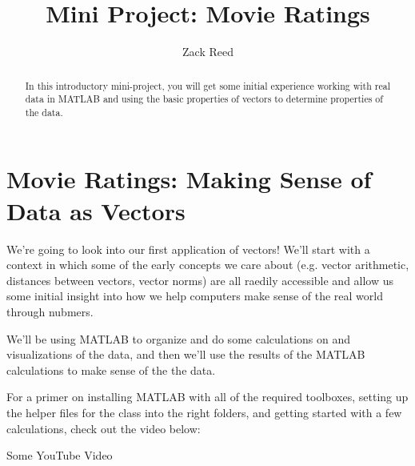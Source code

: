 \documentclass{ximera}
\author{Zack Reed}
\title{Mini Project: Movie Ratings}
\begin{document}
\begin{abstract}

    In this introductory mini-project, you will get some initial experience working with real data in MATLAB and using the basic properties of vectors to determine properties of the data.

\end{abstract}
\maketitle

\section*{Movie Ratings: Making Sense of Data as Vectors}

  We're going to look into our first application of vectors! We'll start with a context in which some of the early concepts we care about (e.g. vector arithmetic, distances between vectors, vector norms) are all raedily accessible and allow us some initial insight into how we help computers make sense of the real world through nubmers. 

  We'll be using MATLAB to organize and do some calculations on and visualizations of the data, and then we'll use the results of the MATLAB calculations to make sense of the the data. 

  \begin{summary} 

    For a primer on installing MATLAB with all of the required toolboxes, setting up the helper files for the class into the right folders, and getting started with a few calculations, check out the video below:

    \begin{center}
      Some YouTube Video
    \end{center}

  \end{summary}
\end{document}

